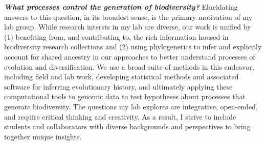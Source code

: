 \textbf{\textit{What processes control the generation of biodiversity?}}
Elucidating answers to this question, in its broadest sense, is the primary
motivation of my lab group.
While research intersts in my lab are diverse, our work is unified by
(1) benefiting from, and contributing to, the rich information housed in
biodiversity research collections
and
(2) using
phylogenetics to infer and explicitly account for shared ancestry in our
approaches to better understand processes of evolution and diversification.
We use a broad suite of methods in this endeavor, including
field and lab work,
developing statistical methods and associated software for inferring evolutionary history,
and ultimately applying these computational tools to genomic data to test
hypotheses about processes that generate biodiversity.
The questions my lab explores are integrative, open-ended, and require critical
thinking and creativity.
As a result,
I strive to include students and collaborators with diverse backgrounds and
perspectives to bring together unique insights.

